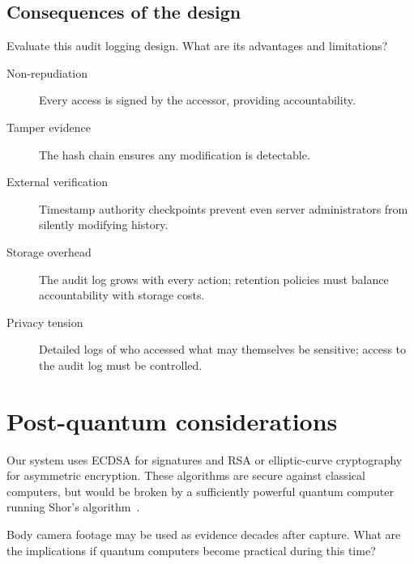 \subsection{Consequences of the design}

\begin{exercise}
  Evaluate this audit logging design.
  What are its advantages and limitations?
\end{exercise}

\begin{description}
  \item[Non-repudiation] Every access is signed by the accessor, providing 
    accountability.
  \item[Tamper evidence] The hash chain ensures any modification is detectable.
  \item[External verification] Timestamp authority checkpoints prevent even 
    server administrators from silently modifying history.
  \item[Storage overhead] The audit log grows with every action; retention 
    policies must balance accountability with storage costs.
  \item[Privacy tension] Detailed logs of who accessed what may themselves be 
    sensitive; access to the audit log must be controlled.
\end{description}


\section{Post-quantum considerations}\label{PostQuantum}


Our system uses ECDSA for signatures and RSA or elliptic-curve cryptography for 
asymmetric encryption.
These algorithms are secure against classical computers, but would be
broken by a sufficiently powerful quantum computer running Shor's
algorithm~\autocite{Shor1997}.

\begin{exercise}
  Body camera footage may be used as evidence decades after capture.
  What are the implications if quantum computers become practical during this 
  time?
\end{exercise}


